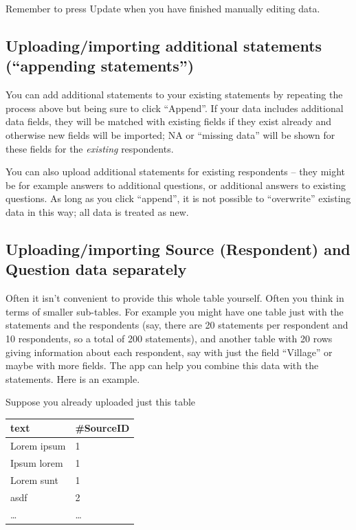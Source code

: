 \documentclass[
]{book}
\begin{document}
Remember to press Update when you have finished manually editing data.

\hypertarget{uploadingimporting-additional-statements-appending-statements}{%
\subsection{Uploading/importing additional statements (``appending statements'')}\label{uploadingimporting-additional-statements-appending-statements}}

You can add additional statements to your existing statements by repeating the process above but being sure to click ``Append''. If your data includes additional data fields, they will be matched with existing fields if they exist already and otherwise new fields will be imported; NA or ``missing data'' will be shown for these fields for the \emph{existing} respondents.

You can also upload additional statements for existing respondents -- they might be for example answers to additional questions, or additional answers to existing questions. As long as you click ``append'', it is not possible to ``overwrite'' existing data in this way; all data is treated as new.

\hypertarget{uploadingimporting-source-respondent-and-question-data-separately}{%
\subsection{Uploading/importing Source (Respondent) and Question data separately}\label{uploadingimporting-source-respondent-and-question-data-separately}}

Often it isn't convenient to provide this whole table yourself. Often you think in terms of smaller sub-tables. For example you might have one table just with the statements and the respondents (say, there are 20 statements per respondent and 10 respondents, so a total of 200 statements), and another table with 20 rows giving information about each respondent, say with just the field ``Village'' or maybe with more fields. The app can help you combine this data with the statements. Here is an example.

Suppose you already uploaded just this table

\begin{longtable}[]{@{}ll@{}}
\toprule
\textbf{text} & \textbf{\#SourceID} \\
\midrule
\endhead
Lorem ipsum & 1 \\
Ipsum lorem & 1 \\
Lorem sunt & 1 \\
asdf & 2 \\
\ldots{} & \ldots{} \\
\bottomrule
\end{longtable}
\end{document}
